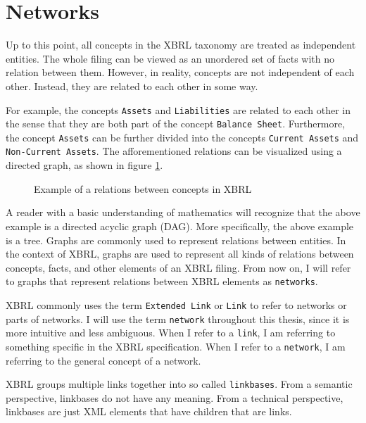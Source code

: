 \section{Networks}
\label{sec:xbrl_networks}

Up to this point, all concepts in the XBRL taxonomy are treated as independent entities.
The whole filing can be viewed as an unordered set of facts with no relation between them.
However, in reality, concepts are not independent of each other.
Instead, they are related to each other in some way.

For example, the concepts \texttt{Assets} and \texttt{Liabilities} are related to each other in the sense that they are both part of the concept \texttt{Balance Sheet}.
Furthermore, the concept \texttt{Assets} can be further divided into the concepts \texttt{Current Assets} and \texttt{Non-Current Assets}.
The afforementioned relations can be visualized using a directed graph, as shown in figure \ref{fig:example_visualization_network_xbrl}.

\begin{figure}[H]
    \caption{Example of a relations between concepts in XBRL}
    \label{fig:example_visualization_network_xbrl}
\end{figure}

A reader with a basic understanding of mathematics will recognize that the above example is a directed acyclic graph (DAG).
More specifically, the above example is a tree.
Graphs are commonly used to represent relations between entities.
In the context of XBRL, graphs are used to represent all kinds of relations between concepts, facts, and other elements of an XBRL filing.
From now on, I will refer to graphs that represent relations between XBRL elements as \texttt{networks}.

XBRL commonly uses the term \texttt{Extended Link} or \texttt{Link} to refer to networks or parts of networks.
I will use the term \texttt{network} throughout this thesis, since it is more intuitive and less ambiguous.
When I refer to a \texttt{link}, I am referring to something specific in the XBRL specification.
When I refer to a \texttt{network}, I am referring to the general concept of a network.

XBRL groups multiple links together into so called \texttt{linkbases}.
From a semantic perspective, linkbases do not have any meaning.
From a technical perspective, linkbases are just XML elements that have children that are links. 


